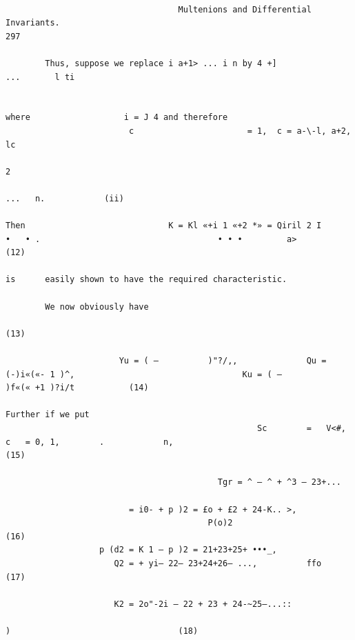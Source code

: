\documentclass[10pt]{article}
\begin{document}
\begin{verbatim}

                                   Multenions and Differential Invariants.                                                                                               297

        Thus, suppose we replace i a+1> ... i n by 4 +]                                                    ...       l ti


where                   i = J 4 and therefore
                         c                       = 1,  c = a-\-l, a+2,  lc
                                                                             2
                                                                                                                                                     ...   n.            (ii)

Then                             K = Kl «+i 1 «+2 *» = Qiril 2 I                 •   • .                                    • • •         a>                             (12)

is      easily shown to have the required characteristic.

        We now obviously have
                                                                                                                                                                         (13)

                       Yu = ( —          )"?/,,              Qu =        (-)i«(«- 1 )^,                                  Ku = ( —               )f«(« +1 )?i/t           (14)

Further if we put
                                                   Sc        =   V<#,                    c   = 0, 1,        .            n,                                              (15)

                                           Tgr = ^ — ^ + ^3 — 23+...

                         = i0- + p )2 = £o + £2 + 24-K.. >,
                                         P(o)2                                                                                                                           (16)
                   p (d2 = K 1 — p )2 = 21+23+25+ •••_,
                      Q2 = + yi— 22— 23+24+26— ...,          ffo                                                                                                         (17)

                      K2 = 2o"-2i — 22 + 23 + 24-~25—...::
                                                                                                                                      )                                  (18)


\end{verbatim}
\end{document}
